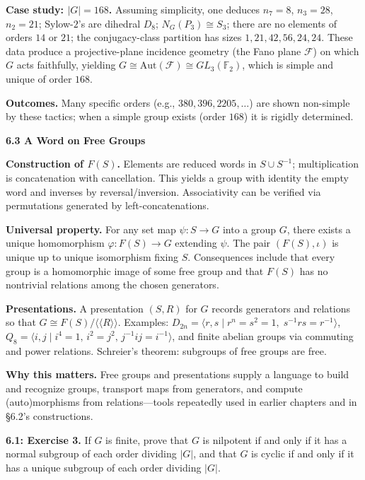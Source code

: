 \documentclass[12pt]{article}
\theoremstyle{definition}
\begin{document}
\textbf{Case study: $|G|=168$.}
Assuming simplicity, one deduces $n_7=8$, $n_3=28$, $n_2=21$; Sylow-$2$’s are dihedral $D_8$; $N_G(P_3)\cong S_3$; there are no elements of orders $14$ or $21$; the conjugacy-class partition has sizes $1,21,42,56,24,24$. These data produce a projective-plane incidence geometry (the Fano plane $\mathcal{F}$) on which $G$ acts faithfully, yielding $G\cong\mathrm{Aut}(\mathcal{F})\cong GL_3(\mathbb{F}_2)$, which is simple and unique of order $168$.

\textbf{Outcomes.}
Many specific orders (e.g., $380, 396, 2205,\dots$) are shown non-simple by these tactics; when a simple group exists (order $168$) it is rigidly determined.

\newpage
\textbf{6.3 \; A Word on Free Groups}
\newpage

\textbf{Construction of $F(S)$.}
Elements are reduced words in $S\cup S^{-1}$; multiplication is concatenation with cancellation. This yields a group with identity the empty word and inverses by reversal/inversion. Associativity can be verified via permutations generated by left-concatenations.

\textbf{Universal property.}
For any set map $\psi:S\to G$ into a group $G$, there exists a unique homomorphism $\varphi:F(S)\to G$ extending $\psi$. The pair $(F(S),\iota)$ is unique up to unique isomorphism fixing $S$. Consequences include that every group is a homomorphic image of some free group and that $F(S)$ has no nontrivial relations among the chosen generators.

\textbf{Presentations.}
A presentation $(S,R)$ for $G$ records generators and relations so that $G\cong F(S)/\langle\!\langle R\rangle\!\rangle$. Examples: $D_{2n}=\langle r,s\mid r^n=s^2=1,\; s^{-1}rs=r^{-1}\rangle$, $Q_8=\langle i,j\mid i^4=1,\, i^2=j^2,\, j^{-1}ij=i^{-1}\rangle$, and finite abelian groups via commuting and power relations. Schreier’s theorem: subgroups of free groups are free.

\medskip
\noindent\textbf{Why this matters.} Free groups and presentations supply a language to build and recognize groups, transport maps from generators, and compute (auto)morphisms from relations—tools repeatedly used in earlier chapters and in \S6.2’s constructions.

\newpage

\newpage

\noindent \textbf{6.1: Exercise 3.} If $G$ is finite, prove that $G$ is nilpotent if and only if it has a normal subgroup of each order dividing $|G|$, and that $G$ is cyclic if and only if it has a unique subgroup of each order dividing $|G|$.\\ %
\end{document}
